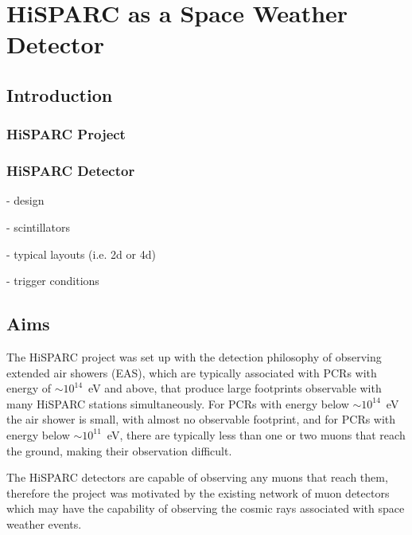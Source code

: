 \chapter{HiSPARC as a Space Weather Detector}\label{chap:HiSPARC}

\section{Introduction}\label{sec:HS_intro}

\subsection{HiSPARC Project}

\subsection{HiSPARC Detector}
 - design
 
 - scintillators
 
 - typical layouts (i.e. 2d or 4d)
 
 - trigger conditions


\section{Aims}\label{sec:HS_aims}
The HiSPARC project was set up with the detection philosophy of observing extended air showers (EAS), which are typically associated with PCRs with energy of $\sim10^{14}$~eV and above, that produce large footprints observable with many HiSPARC stations simultaneously. For PCRs with energy below $\sim10^{14}$~eV the air shower is small, with almost no observable footprint, and for PCRs with energy below $\sim10^{11}$~eV, there are typically less than one or two muons that reach the ground, making their observation difficult. 

The HiSPARC detectors are capable of observing any muons that reach them, therefore the project was motivated by the existing network of muon detectors which may have the capability of observing the cosmic rays associated with space weather events.


